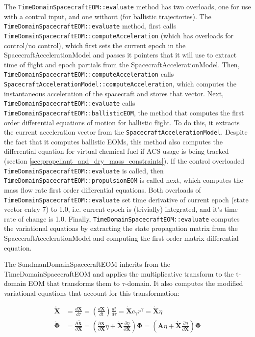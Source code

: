 The \texttt{TimeDomainSpacecraftEOM::evaluate} method has two overloads, one for use with a control input, and one without (for ballistic trajectories). The \texttt{TimeDomainSpacecraftEOM::evaluate} method, first calls \texttt{TimeDomainSpacecraftEOM::computeAcceleration} (which has overloads for control/no control), which first sets the current epoch in the SpacecraftAccelerationModel and passes it pointers that it will use to extract time of flight and epoch partials from the SpacecraftAccelerationModel. Then, \texttt{TimeDomainSpacecraftEOM::computeAcceleration} calls \texttt{SpacecraftAccelerationModel::computeAcceleration}, which computes the instantaneous acceleration of the spacecraft and stores that vector. Next, \texttt{TimeDomainSpacecraftEOM::evaluate} calls \texttt{TimeDomainSpacecraftEOM::ballisticEOM}, the method that computes the first order differential equations of motion for ballistic flight. To do this, it extracts the current acceleration vector from the \texttt{SpacecraftAccelerationModel}. Despite the fact that it computes ballistic EOMs, this method also computes the differential equation for virtual chemical fuel if ACS usage is being tracked (section \ref{sec:propellant_and_dry_mass_constraints}). If the control overloaded \texttt{TimeDomainSpacecraftEOM::evaluate} is called, then \texttt{TimeDomainSpacecraftEOM::propulsionEOM} is called next, which computes the mass flow rate first order differential equations. Both overloads of \texttt{TimeDomainSpacecraftEOM::evaluate} set time derivative of current epoch (state vector entry 7) to 1.0, i.e. current epoch is (trivially) integrated, and it's time rate of change is 1.0. Finally, \texttt{TimeDomainSpacecraftEOM::evaluate} computes the variational equations by extracting the state propagation matrix from the SpacecraftAccelerationModel and computing the first order matrix differential equation.

The SundmanDomainSpacecraftEOM inherits from the TimeDomainSpacecraftEOM and applies the multiplicative transform to the t-domain EOM that transforms them to $\tau$-domain. It also computes the modified variational equations that account for this transformation:

\begin{align}
\mathring{\mathbf{X}} &= \frac{d\mathbf{X}}{d\tau} = \left( \frac{d\mathbf{X}}{dt} \right) \frac{dt}{d\tau} = \dot{\mathbf{X}}c_{\gamma} r^{\gamma} = \dot{\mathbf{X}}\eta\\
\mathring{\mathbf{\Phi}} &= \frac{\partial \mathring{\mathbf{X}}}{\partial \mathbf{X}} = \left( \frac{\partial \dot{\mathbf{X}}}{\partial \mathbf{X}}\eta + \dot{\mathbf{X}}\frac{\partial \eta}{\partial \mathbf{X}} \right) \mathbf{\Phi} = \left( \mathbf{A}\eta + \dot{\mathbf{X}}\frac{\partial \eta}{\partial \mathbf{X}} \right) \mathbf{\Phi}
\end{align}

